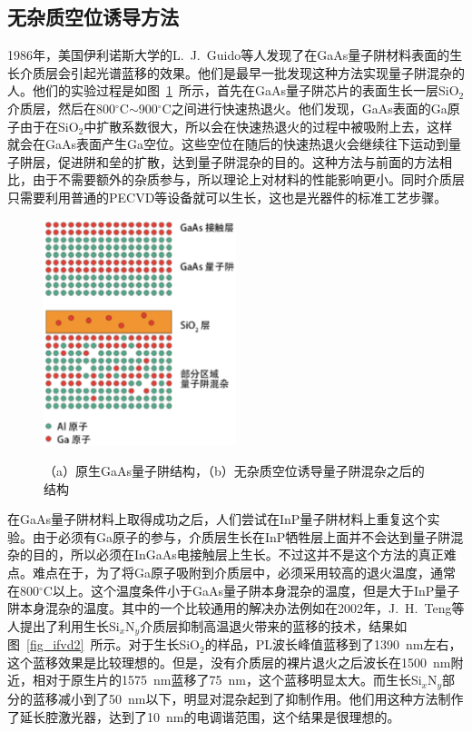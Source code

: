 \documentclass{ZJUthesis}
\begin{document}
\subsection{无杂质空位诱导方法}

1986年，美国伊利诺斯大学的L.~J.~Guido等人发现了在GaAs量子阱材料表面的生长介质层会引起光谱蓝移的效果。他们是最早一批发现这种方法实现量子阱混杂的人。他们的实验过程是如图~\ref{fig_ifvd}~所示，首先在GaAs量子阱芯片的表面生长一层SiO$_2$介质层，然后在800$^{\circ}$C$\sim$900$^{\circ}$C之间进行快速热退火。他们发现，GaAs表面的Ga原子由于在SiO$_2$中扩散系数很大，所以会在快速热退火的过程中被吸附上去，这样就会在GaAs表面产生Ga空位。这些空位在随后的快速热退火会继续往下运动到量子阱层，促进阱和垒的扩散，达到量子阱混杂的目的。这种方法与前面的方法相比，由于不需要额外的杂质参与，所以理论上对材料的性能影响更小。同时介质层只需要利用普通的PECVD等设备就可以生长，这也是光器件的标准工艺步骤。

\begin{figure}[htbp]
  \centering
  \includegraphics[width=0.5\textwidth]{./Pictures/ifvd.eps}\\
  \caption{（a）原生GaAs量子阱结构，（b）无杂质空位诱导量子阱混杂之后的结构}
  \label{fig_ifvd}
\end{figure}

在GaAs量子阱材料上取得成功之后，人们尝试在InP量子阱材料上重复这个实验。由于必须有Ga原子的参与，介质层生长在InP牺牲层上面并不会达到量子阱混杂的目的，所以必须在InGaAs电接触层上生长。不过这并不是这个方法的真正难点。难点在于，为了将Ga原子吸附到介质层中，必须采用较高的退火温度，通常在800$^{\circ}$C以上。这个温度条件小于GaAs量子阱本身混杂的温度，但是大于InP量子阱本身混杂的温度。其中的一个比较通用的解决办法例如在2002年，J.~H.~Teng等人提出了利用生长Si$_x$N$_y$介质层抑制高温退火带来的蓝移的技术\cite{Teng2002Controlled}，结果如图~\ref{fig_ifvd2}~所示。对于生长SiO$_2$的样品，PL波长峰值蓝移到了1390~nm左右，这个蓝移效果是比较理想的。但是，没有介质层的裸片退火之后波长在1500~nm附近，相对于原生片的1575~nm蓝移了75~nm，这个蓝移明显太大。而生长Si$_x$N$_y$部分的蓝移减小到了50~nm以下，明显对混杂起到了抑制作用。他们用这种方法制作了延长腔激光器，达到了10~nm的电调谐范围，这个结果是很理想的。
\end{document}
